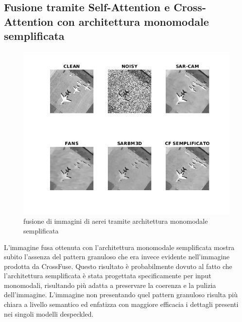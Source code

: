 \subsection{Fusione tramite Self-Attention e Cross-Attention con architettura monomodale semplificata}
\begin{figure}[H] 
  \centering
  \includegraphics[width=1.1\textwidth]{utils/CFLairplane00.png}
  \caption{fusione di immagini di aerei tramite architettura monomodale semplificata}
  \label{fig:airplane00CFL}
\end{figure}
L’immagine fusa ottenuta con l’architettura monomodale semplificata mostra subito l’assenza del 
pattern granuloso che era invece evidente nell’immagine prodotta da CrossFuse. Questo risultato è 
probabilmente dovuto al fatto che l’architettura semplificata è stata progettata specificamente 
per input monomodali, risultando più adatta a preservare la coerenza e la pulizia dell’immagine. 
L'immagine non presentando quel pattern granuloso risulta più chiara a livello semantico ed enfatizza con 
maggiore efficacia i dettagli presenti nei singoli modelli despeckled.
